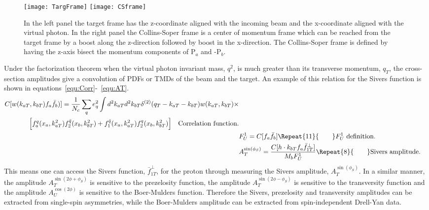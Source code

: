 \begin{figure}[h]
  \centering
  \texttt{[image: TargFrame]}
  \texttt{[image: CSframe]}
    \caption{In the left panel the target frame has the z-coordinate
      aligned with the incoming beam and the x-coordinate aligned with
      the virtual photon.  In the right panel the Collins-Soper frame
      is a center of momentum frame which can be reached from the
      target frame by a boost along the z-direction followed by boost
      in the x-direction.  The Collins-Soper frame is defined by
      having the z-axis bisect the momentum components of P$_a$ and
      -P$_b$.}
    \label{fig:CSframe}%
\end{figure}
    
Under the factorization theorem when the virtual photon invariant
mass, $q^2$, is much greater than its transverse momentum, $q_T$, the
cross-section amplitudes give a convolution of PDFs or TMDs of the
beam and the target.  An example of this relation for the Sivers
function is shown in equations~\ref{equ:Corr}-~\ref{equ:AT}.
%
\begin{subequations}
  \begin{align}
    \begin{split}
      C[w(k_{aT},k_{bT})f_a\bar{f}_b)] = \frac{1}{N_c}\sum_q e_q^2\int
      d^2k_{aT}d^2k_{bT}\delta^{(2)}(q_T - k_{aT}-k_{bT})w(k_{aT},
      k_{bT})\times\\ \Big [ f^q_a(x_a, k^2_{aT})f^{\bar q}_2(x_b,
        k^2_{bT}) + f^{\bar q}_1(x_a, k^2_{aT})f^q_2(x_b, k^2_{bT})
        \Big ] \quad \text{Correlation function.}\label{equ:Corr}
      \end{split}\\
    & F^1_U = C[f_a\bar{f}_b] \Repeat{11}{\qquad} \text{$F^1_U$
      definition. }\\ & A_T^{\sin(\phi_S)} = \frac{C[h \cdot k_{bT}f_a
        \bar{f}^{\perp}_{1T}]}{M_b F^1_U} \Repeat{8}{\qquad}
    \text{Sivers amplitude.}\label{equ:AT}
  \end{align}
  \label{equ:SivCorr}
\end{subequations}
%
This means one can access the Sivers function,
$\bar{f}^{\perp}_{1T}$, for the proton through measuring the Sivers
amplitude, $A_T^{\sin(\phi_S)}$.  In a similar manner, the amplitude
$A_T^{\sin(2\phi+\phi_S)}$ is sensitive to the prezelosity function,
the amplitude $A_T^{\sin(2\phi-\phi_S)}$ is sensitive to the
transversity function and the amplitude $A_U^{\cos(2\phi)}$ is
sensitive to the Boer-Mulders function.  Therefore the Sivers,
prezelosity and transversity amplitudes can be extracted from
single-spin asymmetries, while the Boer-Mulders amplitude can be
extracted from spin-independent Drell-Yan data. \par

